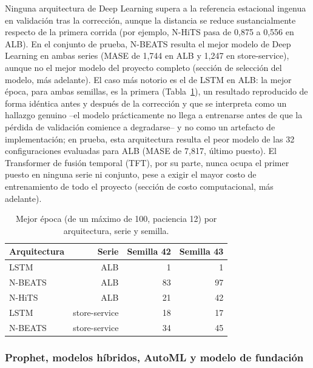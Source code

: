 Ninguna arquitectura de Deep Learning supera a la referencia estacional ingenua en validación tras la
corrección, aunque la distancia se reduce sustancialmente respecto de la primera corrida (por ejemplo,
N-HiTS pasa de 0,875 a 0,556 en ALB). En el conjunto de prueba, N-BEATS resulta el mejor modelo de Deep
Learning en ambas series (MASE de 1,744 en ALB y 1,247 en store-service), aunque no el mejor modelo del
proyecto completo (sección de selección del modelo, más adelante). El caso más notorio es el de LSTM en ALB: la mejor época,
para ambas semillas, es la primera (Tabla~\ref{tab:mejor_epoca}), un resultado reproducido de forma idéntica
antes y después de la corrección y que se interpreta como un hallazgo genuino --el modelo prácticamente no
llega a entrenarse antes de que la pérdida de validación comience a degradarse-- y no como un artefacto de
implementación; en prueba, esta arquitectura resulta el peor modelo de las 32 configuraciones evaluadas
para ALB (MASE de 7,817, último puesto). El Transformer de fusión temporal (TFT), por su parte, nunca ocupa
el primer puesto en ninguna serie ni conjunto, pese a exigir el mayor costo de entrenamiento de todo el
proyecto (sección de costo computacional, más adelante).

\begin{table}[htbp]
  \centering
  \caption{Mejor época (de un máximo de 100, paciencia 12) por arquitectura, serie y semilla.}
  \label{tab:mejor_epoca}
  \small
  \begin{tabular}{lrrr}
    \toprule
    Arquitectura & Serie & Semilla 42 & Semilla 43 \\
    \midrule
    LSTM   & ALB            & 1  & 1  \\
    N-BEATS & ALB           & 83 & 97 \\
    N-HiTS  & ALB           & 21 & 42 \\
    LSTM   & store-service  & 18 & 17 \\
    N-BEATS & store-service & 34 & 45 \\
    \bottomrule
  \end{tabular}
\end{table}

\subsubsection{Prophet, modelos híbridos, AutoML y modelo de fundación}

